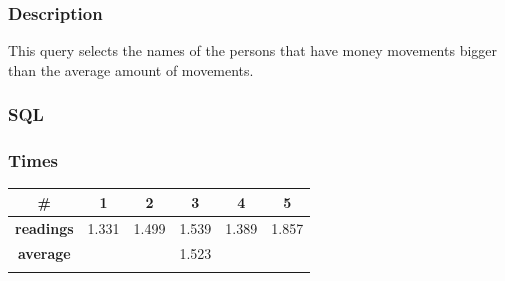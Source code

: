 \documentclass[a4paper, 10pt]{article}
\begin{document}
\subsubsection{Description}
This query selects the names of the persons that have money movements bigger than the average amount of movements.
\subsubsection{SQL}
\subsubsection{Times}
\begin{table}[H]
\centering
\begin{tabular}{cccccc}
\hline
\multicolumn{1}{|c|}{\textbf{\#}}       & \multicolumn{1}{c|}{\textbf{1}} & \multicolumn{1}{c|}{\textbf{2}} & \multicolumn{1}{c|}{\textbf{3}} & \multicolumn{1}{c|}{\textbf{4}} & \multicolumn{1}{c|}{\textbf{5}} \\ \hline
\multicolumn{1}{|c|}{\textbf{readings}} & \multicolumn{1}{c|}{1.331}           & \multicolumn{1}{c|}{1.499}           & \multicolumn{1}{c|}{1.539}           & \multicolumn{1}{c|}{1.389}           & \multicolumn{1}{c|}{1.857}           \\ \hline
\multicolumn{1}{|c|}{\textbf{average}}      & \multicolumn{5}{c|}{1.523}                                                                                                                                                   \\ \hline
\textbf{}                               & \textbf{}                       & \textbf{}                       & \textbf{}                       & \textbf{}                       & \textbf{}                      
\end{tabular}
\end{table}
\end{document}

